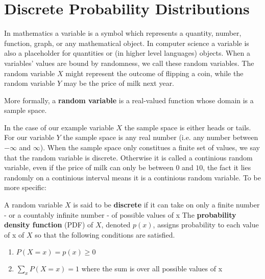 \chapter{Discrete Probability Distributions}
\label{chapter2}

\par
In mathematics a variable is a symbol which represents a quantity, number, function, graph, or any mathematical object.
In computer science a variable is also a placeholder for quantities or (in higher level languages) objects. When a variables' values
are bound by randomness, we call these random variables. The random variable $X$ might represent the outcome of flipping a coin, while
the random variable $Y$ may be the price of milk next year.\newline \par

More formally, a \textbf{random variable} is a real-valued function whose domain is a sample space.\newline \par

In the case of our example variable $X$ the sample space is either heads or tails. For our variable $Y$ the sample space is any real number
(i.e. any number between $-\infty$ and $\infty$). When the sample space only constitues a finite set of values, we say that the random variable
is discrete. Otherwise it is called a continious random variable, even if the price of milk can only be between $0$ and $10$, the fact it lies randomly on
a continious interval means it is a continious random variable. To be more specific: \newline \par

A random variable $X$ is said to be \textbf{discrete} if it can take on only a finite number - or a countably infinite number - of possible values of x
The \textbf{probability density function} (PDF) of $X$, denoted $p(x)$, assigns probability to each value of x of $X$ so that the following conditions are satisfied.

\begin{enumerate}
	\item $P(X=x) = p(x) \geq 0$
	\item $\sum_{x}P(X=x)=1$ where the sum is over all possible values of x
\end{enumerate}\par

